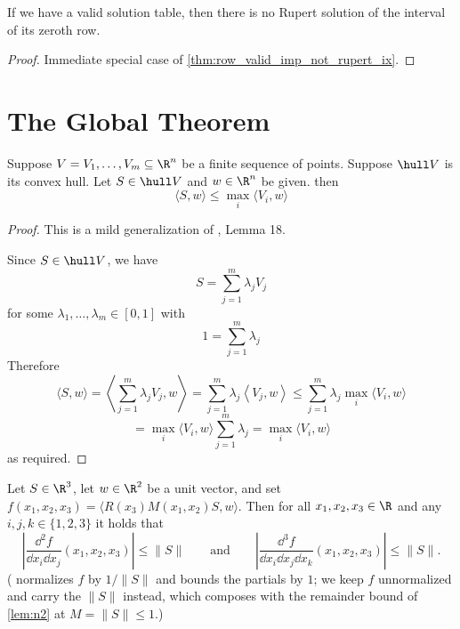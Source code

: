 \begin{corollary}
\leanok
{}
\label{thm:row_valid_imp_not_rupert}
If we have a valid solution table, then there is no Rupert solution of the interval of its zeroth row.
\end{corollary}

\begin{proof}
\leanok
{}
Immediate special case of \cref{thm:row_valid_imp_not_rupert_ix}.
\end{proof}


\chapter{The Global Theorem}

\begin{lemma} \label{lem:hullscalarprod}
\leanok
{}
Suppose $V = V_1, \ldots, V_m \subseteq \R^n$ be a finite sequence of points. Suppose $\hull V$ is its convex hull.
Let $S \in \hull V$ and $w \in \R^n$ be given. then
    \[
        \langle S ,w \rangle \leq \max_{i} \langle V_i ,w\rangle
    \]
\end{lemma}

\begin{proof}
\leanok
This is a mild generalization of \cite{polyhedron.without.rupert}, Lemma 18.

Since $S \in \hull V$, we have
\[ S = \sum_{j=1}^m \lambda_j V_j \]
for some $\lambda_1,\ldots,\lambda_m \in [0,1]$ with
\[ 1 = \sum_{j=1}^m \lambda_j  \]
Therefore
\[
\langle S ,w \rangle = \left\langle  \sum_{j=1}^m \lambda_j V_j ,w \right\rangle
=  \sum_{j=1}^m \lambda_j \left\langle   V_j ,w \right\rangle
\le   \sum_{j=1}^m \lambda_j \max_{i} \langle V_i ,w\rangle
\]
\[
=  \max_{i} \langle V_i ,w\rangle \sum_{j=1}^m \lambda_j
=  \max_{i} \langle V_i ,w\rangle
\]
as required.
\end{proof}


\begin{lemma} \label{lem:leq1}
\leanok
    Let $S \in \R^3$, let $w \in \R^2$ be a unit vector, and set $f(x_1,x_2,x_3) = \langle R(x_3) M(x_1,x_2)S,w \rangle$. Then for all $x_1,x_2,x_3 \in \R$ and any $i,j,k \in \{1,2,3\}$ it holds that
    \[
        \left|\frac{\dd^2 f}{\dd x_i \dd x_j}(x_1,x_2,x_3)\right|\leq \|S\|
        \qquad\text{and}\qquad
        \left|\frac{\dd^3 f}{\dd x_i \dd x_j \dd x_k}(x_1,x_2,x_3)\right|\leq \|S\|.
    \]
    (\cite{polyhedron.without.rupert} normalizes $f$ by $1/\|S\|$ and bounds the
    partials by $1$; we keep $f$ unnormalized and carry the $\|S\|$ instead,
    which composes with the remainder bound of \cref{lem:n2} at $M = \|S\| \leq 1$.)
\end{lemma}


